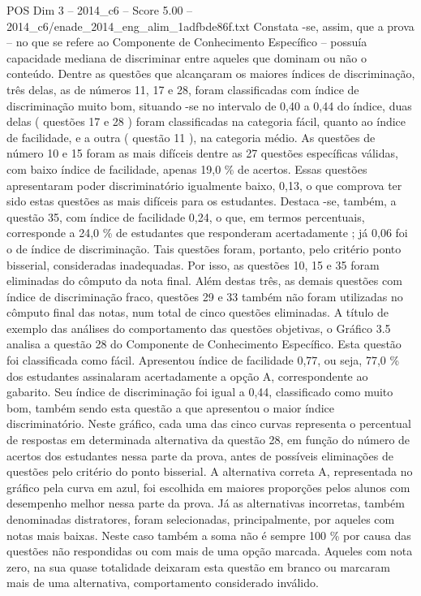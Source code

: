 \begin{textsample}{POS Dim 3 – 2014\_c6 – Score 5.00 – 2014\_c6/enade\_2014\_eng\_alim\_1adfbde86f.txt}
Constata -se, assim, que a prova – no que se refere ao Componente de Conhecimento Específico – possuía capacidade mediana de discriminar entre aqueles que dominam ou não o conteúdo.
Dentre as questões que alcançaram os maiores índices de discriminação, três delas, as de números 11, 17 e 28, foram classificadas com índice de discriminação muito bom, situando -se no intervalo de 0,40 a 0,44 do índice, duas delas ( questões 17 e 28 ) foram classificadas na categoria fácil, quanto ao índice de facilidade, e a outra ( questão 11 ), na categoria médio.
As questões de número 10 e 15 foram as mais difíceis dentre as 27 questões específicas válidas, com baixo índice de facilidade, apenas 19,0 \% de acertos.
Essas questões apresentaram poder discriminatório igualmente baixo, 0,13, o que comprova ter sido estas questões as mais difíceis para os estudantes.
Destaca -se, também, a questão 35, com índice de facilidade 0,24, o que, em termos percentuais, corresponde a 24,0 \% de estudantes que responderam acertadamente ; já 0,06 foi o de índice de discriminação.
Tais questões foram, portanto, pelo critério ponto bisserial, consideradas inadequadas.
Por isso, as questões 10, 15 e 35 foram eliminadas do cômputo da nota final.
Além destas três, as demais questões com índice de discriminação fraco, questões 29 e 33 também não foram utilizadas no cômputo final das notas, num total de cinco questões eliminadas.
A título de exemplo das análises do comportamento das questões objetivas, o Gráfico 3.5 analisa a questão 28 do Componente de Conhecimento Específico.
Esta questão foi classificada como fácil.
Apresentou índice de facilidade 0,77, ou seja, 77,0 \% dos estudantes assinalaram acertadamente a opção A, correspondente ao gabarito.
Seu índice de discriminação foi igual a 0,44, classificado como muito bom, também sendo esta questão a que apresentou o maior índice discriminatório.
Neste gráfico, cada uma das cinco curvas representa o percentual de respostas em determinada alternativa da questão 28, em função do número de acertos dos estudantes nessa parte da prova, antes de possíveis eliminações de questões pelo critério do ponto bisserial.
A alternativa correta A, representada no gráfico pela curva em azul, foi escolhida em maiores proporções pelos alunos com desempenho melhor nessa parte da prova.
Já as alternativas incorretas, também denominadas distratores, foram selecionadas, principalmente, por aqueles com notas mais baixas.
Neste caso também a soma não é sempre 100 \% por causa das questões não respondidas ou com mais de uma opção marcada.
Aqueles com nota zero, na sua quase totalidade deixaram esta questão em branco ou marcaram mais de uma alternativa, comportamento considerado inválido.

\end{textsample}
